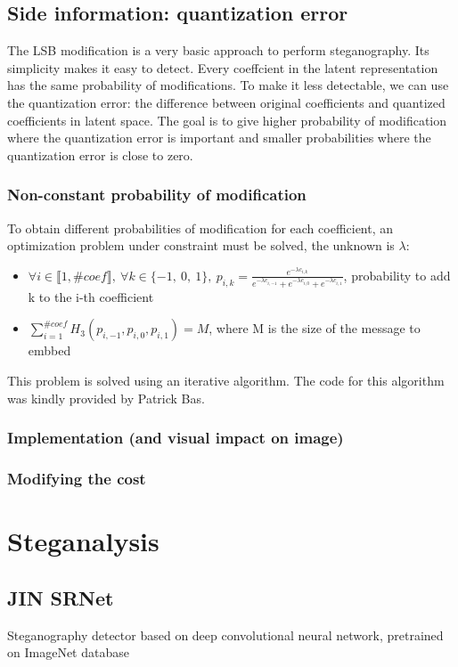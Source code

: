 \documentclass[12pt]{article}
\begin{document}
\subsection{Side information: quantization error}
The LSB modification is a very basic approach to perform steganography. Its simplicity makes it easy to detect. Every coeffcient in the latent representation has the same probability of modifications. To make it less detectable, we can use the quantization error: the difference between original coefficients and quantized coefficients in latent space. The goal is to give higher probability of modification where the quantization error is important and smaller probabilities where the quantization error is close to zero.  
\subsubsection{Non-constant probability of modification}
To obtain different probabilities of modification for each coefficient, an optimization problem under constraint must be solved, the unknown is $\lambda$:
\begin{itemize}
    \item $\forall i \in \llbracket 1, \# coef \rrbracket,\ \forall k \in \{-1,\ 0,\ 1 \},\ p_{i,k} = \frac{e^{-\lambda c_{i,k}}}{e^{-\lambda c_{i,-1}} + e^{-\lambda c_{i,0}} + e^{-\lambda c_{i,1}}}$, probability to add k to the i-th coefficient
    \item $\displaystyle\sum_{i=1}^{\# coef}{H_3(p_{i,-1},p_{i,0},p_{i,1})} = M$, where M is the size of the message to embbed
\end{itemize}
This problem is solved using an iterative algorithm. The code for this algorithm was kindly provided by Patrick Bas.

\subsubsection{Implementation (and visual impact on image)}
\subsubsection{Modifying the cost}

\section{Steganalysis}
\subsection{JIN SRNet}
Steganography detector based on deep convolutional neural network, pretrained on ImageNet database
\end{document}
